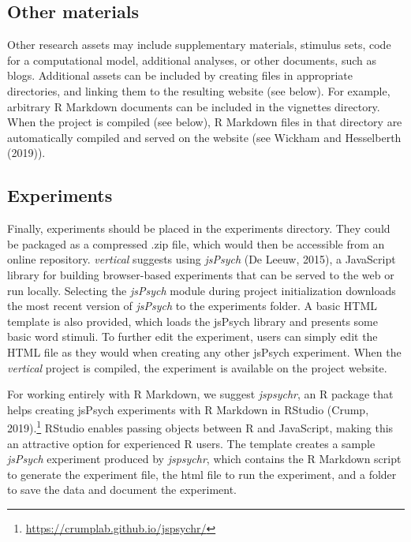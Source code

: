 \documentclass[
  english,
  jou,floatsintext]{apa6}
\begin{document}
\hypertarget{other-materials}{%
\subsection{Other materials}\label{other-materials}}

Other research assets may include supplementary materials, stimulus sets, code for a computational model, additional analyses, or other documents, such as blogs. Additional assets can be included by creating files in appropriate directories, and linking them to the resulting website (see below). For example, arbitrary R Markdown documents can be included in the vignettes directory. When the project is compiled (see below), R Markdown files in that directory are automatically compiled and served on the website (see Wickham and Hesselberth (2019)).

\hypertarget{experiments}{%
\subsection{Experiments}\label{experiments}}

Finally, experiments should be placed in the experiments directory. They could be packaged as a compressed .zip file, which would then be accessible from an online repository. \emph{vertical} suggests using \emph{jsPsych} (De Leeuw, 2015), a JavaScript library for building browser-based experiments that can be served to the web or run locally. Selecting the \emph{jsPsych} module during project initialization downloads the most recent version of \emph{jsPsych} to the experiments folder. A basic HTML template is also provided, which loads the jsPsych library and presents some basic word stimuli. To further edit the experiment, users can simply edit the HTML file as they would when creating any other jsPsych experiment. When the \emph{vertical} project is compiled, the experiment is available on the project website.

For working entirely with R Markdown, we suggest \emph{jspsychr}, an R package that helps creating jsPsych experiments with R Markdown in RStudio (Crump, 2019).\footnote{\url{https://crumplab.github.io/jspsychr/}} RStudio enables passing objects between R and JavaScript, making this an attractive option for experienced R users. The template creates a sample \emph{jsPsych} experiment produced by \emph{jspsychr}, which contains the R Markdown script to generate the experiment file, the html file to run the experiment, and a folder to save the data and document the experiment.
\end{document}
